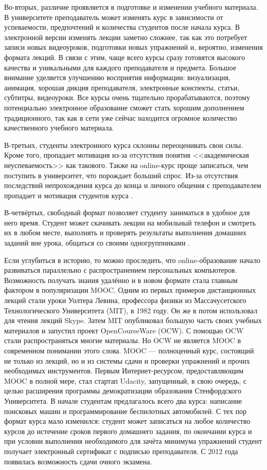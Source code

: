 \documentclass{matmex-diploma-custom}
\begin{document}
Во-вторых, различие проявляется в подготовке и изменении учебного
материала. В университете преподаватель может изменять курс в
зависимости от успеваемости, предпочтений и количества студентов после
начала курса. В электронной версии изменять лекции заметно сложнее,
так как это потребует записи новых видеоуроков, подготовки новых
упражнений и, вероятно, изменения формата лекций. В связи с этим, чаще
всего курсы сразу готовятся высокого качества и уникальными для
каждого преподавателя и предмета. Большое внимание уделяется улучшению
восприятия информации: визуализация, анимация, хорошая дикция
преподавателя, электронные конспекты, статьи, субтитры,
видеоуроки. Все курсы очень тщательно прорабатываются, поэтому
потенциально электронное образование сможет стать хорошим дополнением
традиционного, так как в сети уже сейчас находится огромное количество
качественного учебного материала.

В-третьих, студенты электронного курса склонны переоценивать свои
силы. Кроме того, пропадает мотивация из-за отсутствия понятия
<<академическая неуспеваемость>> как такового. Также на online-курс
проще записаться, чем поступить в университет, что порождает больший
спрос. Из-за отсутствия последствий непрохождения курса до конца и
личного общения с преподавателем пропадает и мотивация студентов курса
\cite{Clow}.

В-четвёртых, свободный формат позволяет студенту заниматься в удобное
для него время. Студент может скачивать лекции на мобильный телефон и
смотреть их в любом месте, выполнять и проверять результаты выполнения
домашних заданий вне урока, общаться со своими одногруппниками
\cite{mak2010blogs}.

Если углубиться в историю, то можно проследить, что online-образование
начало развиваться параллельно с распространением персональных
компьютеров. Возможность получать знания удалённо и в новом формате
стала главным фактором в популяризации MOOC. Одним из первых примеров
дистанционных лекций стали уроки Уолтера Левина, профессора физики из
Массачусетского Технологического Университета (MIT), в 1982 году. Он
же в потом использовал для чтения лекций Skype. Затем MIT опубликовал
большую часть своих учебных материалов и запустил проект
OpenCourseWare (OCW). С помощью OCW стали распространяться многие
материалы. Но OCW не является MOOC в современном понимании этого
слова. MOOC --- полноценный курс, состоящий не только из лекций, но и
из системы сдачи и проверки упражнений и прочих необходимых
инструментов. Первым Интернет-ресурсом, предоставляющим MOOC в полной
мере, стал стартап Udacity, запущенный, в свою очередь, с целью
расширения программы демократизации образования Стенфордского
Университета. В начале студентам предлагалось всего два курса:
написание поисковых машин и программирование беспилотных
автомобилей. С тех пор формат курса мало изменился: студент может
записаться на любое количество курсов до истечение сроков первого
домашнего задания, по окончании курса и при условии выполнения
необходимого для зачёта минимума упражнений студент получает
электронный сертификат с подписью преподавателя. С 2012 года появилась
возможность сдачи очного экзамена.
\end{document}
